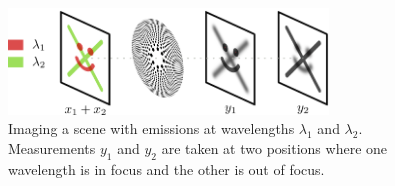 \documentclass{article}
\begin{document}
\begin{figure}[htb]
  \begin{minipage}[b]{1\linewidth}
    \centering
    \centerline{\includegraphics[width=8.5cm]{diffraction_system}}
  \end{minipage}
  \caption{Imaging a scene with emissions at wavelengths $\lambda_1$ and
  $\lambda_2$. Measurements $y_1$ and $y_2$ are taken at two positions where one wavelength
  is in focus and the other is out of focus.}
  \label{fig:pssi_drawing}
\end{figure}




\end{document}
